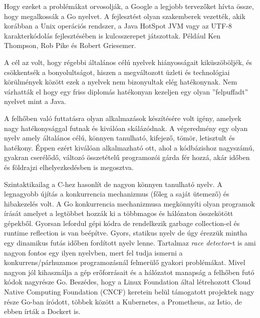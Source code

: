 Hogy ezeket a problémákat orvosolják, a Google a legjobb tervezőket hívta össze, hogy megalkossák a Go nyelvet.
A fejlesztést olyan szakemberek vezették, akik korábban a Unix operációs rendszer, a Java HotSpot JVM
vagy az UTF-8 karakterkódolás fejlesztésében is kulcsszerepet játszottak.
Például Ken Thompson, Rob Pike és Robert Griesemer.

A cél az volt, hogy régebbi általános célú nyelvek hiányosságait kiküszöböljék, és csökkentsék a bonyolultságot, hiszen a megváltozott üzleti és technológiai körülmények
között ezek a nyelvek nem bizonyultak elég hatékonynak.
Nem várhatták el hogy egy friss diplomás hatékonyan kezeljen egy olyan ''felpuffadt'' nyelvet mint a Java.

A felhőben való futtatásra olyan alkalmazások készítésére volt igény, amelyek nagy hatékonysággal futnak és kiválóan skálázódnak.
A végeredmény egy olyan nyelv amely általános célú, könnyen tanulható, kifejező, tömör, letisztult és hatékony.
Éppen ezért kiválóan alkalmazható ott, ahol a kódbázishoz nagyszámú, gyakran cserélődő, változó összetételű programozói gárda fér hozzá,
akár időben és földrajzi elhelyezkedésben is megosztva.

Szintaktikailag a C-hez hasonlít de nagyon könnyen tanulható nyelv.
A legnagyobb újítás a konkurrencia mechanizmus (főleg a saját ütemező) és hibakezelés volt.
A Go konkurrencia mechanizmusa megkönnyíti olyan programok írását amelyet a legtöbbet hozzák ki a többmagos és hálózaton összekötött gépekből.
Gyorsan lefordul gépi kódra de rendelkezik garbage collection-el és runtime reflection is van beépítve.
Gyors, statikus nyelv de úgy érezzük mintha egy dinamikus futás időben fordított nyelv lenne.
Tartalmaz \textit{race detector}-t is ami nagyon fontos egy ilyen nyelvben, mert fel tudja ismerni a konkurrens/párhuzamos programozásnál felmerülő gyakori problémákat.
Mivel nagyon jól kihasználja a gép erőforrásait és a hálózatot manapság a felhőben futó kódok nagyrésze Go.
Beszédes, hogy a Linux Foundation által létrehozott Cloud Native Computing Foundation (CNCF) keretein
belül támogatott projektek nagy része Go-ban íródott, többek között a Kubernetes, a Prometheus, az Istio, de ebben írták a Dockert is.


